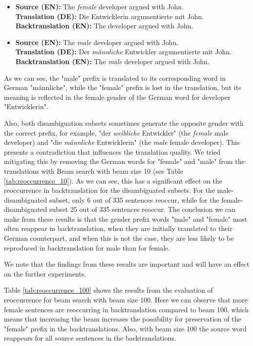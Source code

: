 \begin{itemize}
    \item \textbf{Source (EN):} The \textit{female} developer argued with John. \\
    \textbf{Translation (DE):} Die Entwicklerin argumentierte mit John. \\
    \textbf{Backtranslation (EN):} The developer argued with John.
    
    \item \textbf{Source (EN):} The \textit{male} developer argued with John. \\
    \textbf{Translation (DE):} Der \textit{männliche} Entwickler argumentierte mit John. \\
    \textbf{Backtranslation (EN):} The \textit{male} developer argued with John.
\end{itemize}

As we can see, the "male" prefix is translated to its corresponding word in German "männliche", while the "female" prefix is lost in the translation, but its meaning is reflected in the female gender of the German word for developer "Entwicklerin".

Also, both disambiguation subsets sometimes generate the opposite gender with the correct prefix, for example, "der \textit{weibliche} Entwickler" (the \textit{female} male developer) and "die \textit{männliche} Entwicklerin" (the \textit{male} female developer). This presents a contradiction that influences the translation quality. We tried mitigating this by removing the German words for "female" and "male" from the translations with Beam search with beam size 10 (see Table \ref{tab:reoccurrence_10}). As we can see, this has a significant effect on the reoccurrence in backtranslation for the disambiguated subsets. For the male-disambiguated subset, only 6 out of 335 sentences reoccur, while for the female-disambiguated subset 25 out of 335 sentences reoccur. The conclusion we can make from these results is that the gender prefix words "male" and "female" most often reappear in backtranslation, when they are initially translated to their German counterpart, and when this is not the case, they are less likely to be reproduced in backtranslation for male than for female.

We note that the findings from these results are important and will have an effect on the further experiments.

Table \ref{tab:reoccurrence_100} shows the results from the evaluation of reoccurrence for beam search with beam size 100. Here we can observe that more female sentences are reoccurring in backtranslation compared to beam 100, which means that increasing the beam increases the possibility for preservation of the "female" prefix in the backtranslations. Also, with beam size 100 the source word reappears for all source sentences in the backtranslations.

